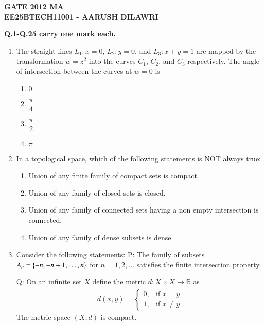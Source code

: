 \documentclass[journal]{IEEEtran}
\numberwithin{equation}{enumi}
\numberwithin{figure}{enumi}
\begin{document}


\begin{center}
    \LARGE \textbf{GATE 2012 MA}\\[0.5em]
    \large \textbf{EE25BTECH11001 - AARUSH DILAWRI}
\end{center}
\begin{center}
 \textbf{Q.1-Q.25 carry one mark each.}
\end{center}
\vspace{0.25em}

\begin{enumerate}

\item
The straight lines $L_1: x = 0$, $L_2: y = 0$, and $L_3: x + y = 1$ are mapped by the transformation $w = z^2$ into the curves $C_1$, $C_2$, and $C_3$ respectively. The angle of intersection between the curves at $w = 0$ is
\hfill{}
\begin{multicols}{2}
\begin{enumerate}
  \item $0$
  \item $\dfrac{\pi}{4}$
  \item $\dfrac{\pi}{2}$
  \item $\pi$
\end{enumerate}
\end{multicols}

\item
In a topological space, which of the following statements is NOT always true:

\hfill{}

\begin{enumerate}
  \item Union of any finite family of compact sets is compact.
  \item Union of any family of closed sets is closed.
  \item Union of any family of connected sets having a non empty intersection is connected.
  \item Union of any family of dense subsets is dense.
\end{enumerate}


\item
Consider the following statements:
P: The family of subsets $A_n = \left\{-n, -n+1, \ldots, n\right\}$ for $n=1,2,\ldots$ satisfies the finite intersection property.

Q: On an infinite set $X$ define the metric $d: X \times X \to \mathbb{R}$ as
\begin{align}
d(x, y) =
\begin{cases}
0, & \text{if } x = y \\
1, & \text{if } x \ne y
\end{cases}
\end{align}
The metric space $(X, d)$ is compact.


\end{enumerate}
\end{document}
